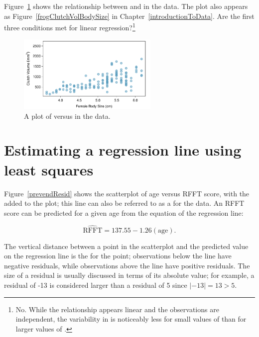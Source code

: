 \begin{exercise} \label{nonConstantVariance}
Figure~\ref{frogClutchVolBodySizeRegress} shows the relationship between  and  in the  data.  The plot also appears as Figure~\ref{frogClutchVolBodySize} in Chapter~\ref{introductionToData}. Are the first three conditions met for linear regression?\footnote{No. While the relationship appears linear and the observations are independent, the variability in  is noticeably less for small values of  than for larger values of .}

\begin{figure}[h!]
	\centering
	\includegraphics[width=0.6\textwidth]
	{ch_intro_to_data_oi_biostat/figures/frogClutchVolBodySize/frogClutchVolBodySize}
	\caption{A plot of  versus  in the  data.}
	\label{frogClutchVolBodySizeRegress}
\end{figure}


\end{exercise}

\section{Estimating a regression line using least squares}
\label{estimatingLeastSquaresLine}


Figure~\ref{prevendResid} shows the scatterplot of age versus RFFT score, with the  added to the plot; this line can also be referred to as a  for the data. An RFFT score can be predicted for a given age from the equation of the regression line:

\[\widehat{\text{RFFT}} = 137.55 - 1.26(\text{age}). \]


The vertical distance between a point in the scatterplot and the predicted value on the regression line is the  for the point; observations below the line have negative residuals, while observations above the line have positive residuals. The size of a residual is usually discussed in terms of its absolute value; for example, a residual of -13 is considered larger than a residual of 5 since $|-13| = 13 > 5$.

